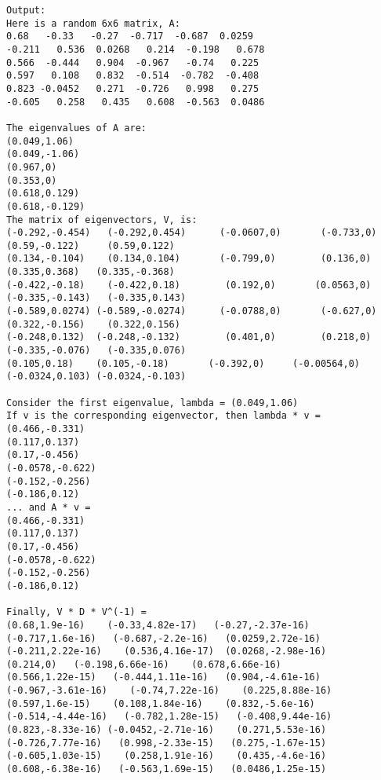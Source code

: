 \begin{verbatim}
Output:
Here is a random 6x6 matrix, A:
0.68   -0.33   -0.27  -0.717  -0.687  0.0259
-0.211   0.536  0.0268   0.214  -0.198   0.678
0.566  -0.444   0.904  -0.967   -0.74   0.225
0.597   0.108   0.832  -0.514  -0.782  -0.408
0.823 -0.0452   0.271  -0.726   0.998   0.275
-0.605   0.258   0.435   0.608  -0.563  0.0486

The eigenvalues of A are:
(0.049,1.06)
(0.049,-1.06)
(0.967,0)
(0.353,0)
(0.618,0.129)
(0.618,-0.129)
The matrix of eigenvectors, V, is:
(-0.292,-0.454)   (-0.292,0.454)      (-0.0607,0)       (-0.733,0)    (0.59,-0.122)     (0.59,0.122)
(0.134,-0.104)    (0.134,0.104)       (-0.799,0)        (0.136,0)    (0.335,0.368)   (0.335,-0.368)
(-0.422,-0.18)    (-0.422,0.18)        (0.192,0)       (0.0563,0)  (-0.335,-0.143)   (-0.335,0.143)
(-0.589,0.0274) (-0.589,-0.0274)      (-0.0788,0)       (-0.627,0)   (0.322,-0.156)    (0.322,0.156)
(-0.248,0.132)  (-0.248,-0.132)        (0.401,0)        (0.218,0)  (-0.335,-0.076)   (-0.335,0.076)
(0.105,0.18)    (0.105,-0.18)       (-0.392,0)     (-0.00564,0)  (-0.0324,0.103) (-0.0324,-0.103)

Consider the first eigenvalue, lambda = (0.049,1.06)
If v is the corresponding eigenvector, then lambda * v = 
(0.466,-0.331)
(0.117,0.137)
(0.17,-0.456)
(-0.0578,-0.622)
(-0.152,-0.256)
(-0.186,0.12)
... and A * v = 
(0.466,-0.331)
(0.117,0.137)
(0.17,-0.456)
(-0.0578,-0.622)
(-0.152,-0.256)
(-0.186,0.12)

Finally, V * D * V^(-1) = 
(0.68,1.9e-16)    (-0.33,4.82e-17)   (-0.27,-2.37e-16)    (-0.717,1.6e-16)   (-0.687,-2.2e-16)   (0.0259,2.72e-16)
(-0.211,2.22e-16)    (0.536,4.16e-17)  (0.0268,-2.98e-16)           (0.214,0)   (-0.198,6.66e-16)    (0.678,6.66e-16)
(0.566,1.22e-15)   (-0.444,1.11e-16)   (0.904,-4.61e-16)  (-0.967,-3.61e-16)    (-0.74,7.22e-16)    (0.225,8.88e-16)
(0.597,1.6e-15)    (0.108,1.84e-16)    (0.832,-5.6e-16)  (-0.514,-4.44e-16)   (-0.782,1.28e-15)   (-0.408,9.44e-16)
(0.823,-8.33e-16) (-0.0452,-2.71e-16)    (0.271,5.53e-16)   (-0.726,7.77e-16)   (0.998,-2.33e-15)   (0.275,-1.67e-15)
(-0.605,1.03e-15)    (0.258,1.91e-16)    (0.435,-4.6e-16)   (0.608,-6.38e-16)   (-0.563,1.69e-15)   (0.0486,1.25e-15)
\end{verbatim}





%


